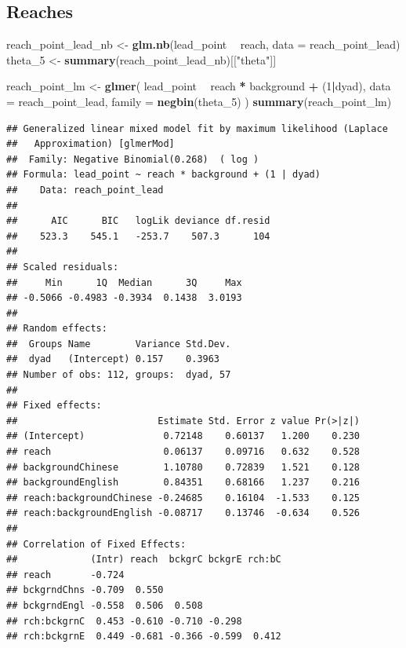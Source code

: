 \documentclass[]{article}
\newenvironment{Shaded}{\begin{snugshade}}{\end{snugshade}}
\newcommand{\DataTypeTok}[1]{\textcolor[rgb]{0.13,0.29,0.53}{#1}}
\newcommand{\DecValTok}[1]{\textcolor[rgb]{0.00,0.00,0.81}{#1}}
\newcommand{\KeywordTok}[1]{\textcolor[rgb]{0.13,0.29,0.53}{\textbf{#1}}}
\newcommand{\NormalTok}[1]{#1}
\newcommand{\OperatorTok}[1]{\textcolor[rgb]{0.81,0.36,0.00}{\textbf{#1}}}
\newcommand{\StringTok}[1]{\textcolor[rgb]{0.31,0.60,0.02}{#1}}
\begin{document}
\hypertarget{reaches}{%
\subsection{Reaches}\label{reaches}}

\begin{Shaded}
\begin{Highlighting}[]
\NormalTok{reach_point_lead_nb <-}\StringTok{ }\KeywordTok{glm.nb}\NormalTok{(lead_point }\OperatorTok{~}\StringTok{ }\NormalTok{reach, }\DataTypeTok{data =}\NormalTok{ reach_point_lead)}
\NormalTok{theta_}\DecValTok{5}\NormalTok{ <-}\StringTok{ }\KeywordTok{summary}\NormalTok{(reach_point_lead_nb)[[}\StringTok{"theta"}\NormalTok{]]}

\NormalTok{reach_point_lm <-}\StringTok{ }\KeywordTok{glmer}\NormalTok{(}
\NormalTok{  lead_point }\OperatorTok{~}
\StringTok{    }\NormalTok{reach }\OperatorTok{*}
\StringTok{    }\NormalTok{background }\OperatorTok{+}
\StringTok{    }\NormalTok{(}\DecValTok{1}\OperatorTok{|}\NormalTok{dyad),}
  \DataTypeTok{data =}\NormalTok{ reach_point_lead,}
  \DataTypeTok{family =} \KeywordTok{negbin}\NormalTok{(theta_}\DecValTok{5}\NormalTok{)}
\NormalTok{)}
\KeywordTok{summary}\NormalTok{(reach_point_lm)}
\end{Highlighting}
\end{Shaded}

\begin{verbatim}
## Generalized linear mixed model fit by maximum likelihood (Laplace
##   Approximation) [glmerMod]
##  Family: Negative Binomial(0.268)  ( log )
## Formula: lead_point ~ reach * background + (1 | dyad)
##    Data: reach_point_lead
## 
##      AIC      BIC   logLik deviance df.resid 
##    523.3    545.1   -253.7    507.3      104 
## 
## Scaled residuals: 
##     Min      1Q  Median      3Q     Max 
## -0.5066 -0.4983 -0.3934  0.1438  3.0193 
## 
## Random effects:
##  Groups Name        Variance Std.Dev.
##  dyad   (Intercept) 0.157    0.3963  
## Number of obs: 112, groups:  dyad, 57
## 
## Fixed effects:
##                         Estimate Std. Error z value Pr(>|z|)
## (Intercept)              0.72148    0.60137   1.200    0.230
## reach                    0.06137    0.09716   0.632    0.528
## backgroundChinese        1.10780    0.72839   1.521    0.128
## backgroundEnglish        0.84351    0.68166   1.237    0.216
## reach:backgroundChinese -0.24685    0.16104  -1.533    0.125
## reach:backgroundEnglish -0.08717    0.13746  -0.634    0.526
## 
## Correlation of Fixed Effects:
##             (Intr) reach  bckgrC bckgrE rch:bC
## reach       -0.724                            
## bckgrndChns -0.709  0.550                     
## bckgrndEngl -0.558  0.506  0.508              
## rch:bckgrnC  0.453 -0.610 -0.710 -0.298       
## rch:bckgrnE  0.449 -0.681 -0.366 -0.599  0.412
\end{verbatim}
\end{document}
